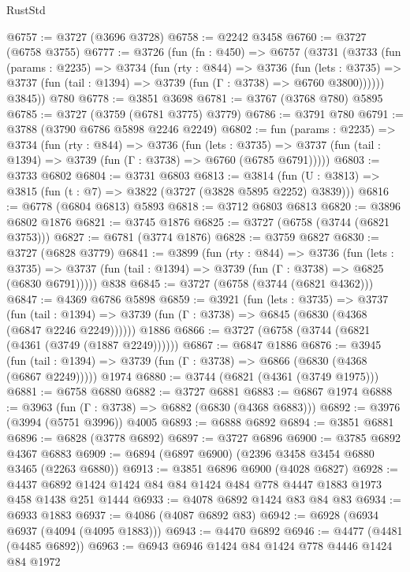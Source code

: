 \begin{lexlean}{RustStd}
\begin{coremodule}
@6757 := @3727 (@3696 @3728)
@6758 := @2242 @3458
@6760 := @3727 (@6758 @3755)
@6777 := @3726
    (fun (fn : @450) =>
    @6757
      (@3731
        (@3733
          (fun (params : @2235) =>
          @3734
            (fun (rty : @844) =>
            @3736
              (fun (lets : @3735) =>
              @3737 (fun (tail : @1394) => @3739 (fun (Γ : @3738) => @6760 @3800))))))
        @3845))
    @780
@6778 := @3851 @3698
@6781 := @3767 (@3768 @780) @5895
@6785 := @3727 (@3759 (@6781 @3775) @3779)
@6786 := @3791 @780
@6791 := @3788 (@3790 @6786 @5898 @2246 @2249)
@6802 := fun (params : @2235) =>
  @3734
    (fun (rty : @844) =>
    @3736
      (fun (lets : @3735) =>
      @3737 (fun (tail : @1394) => @3739 (fun (Γ : @3738) => @6760 (@6785 @6791)))))
@6803 := @3733 @6802
@6804 := @3731 @6803
@6813 := @3814 (fun (U : @3813) => @3815 (fun (t : @7) => @3822 (@3727 (@3828 @5895 @2252) @3839)))
@6816 := @6778 (@6804 @6813) @5893
@6818 := @3712 @6803 @6813
@6820 := @3896 @6802 @1876
@6821 := @3745 @1876
@6825 := @3727 (@6758 (@3744 (@6821 @3753)))
@6827 := @6781 (@3774 @1876)
@6828 := @3759 @6827
@6830 := @3727 (@6828 @3779)
@6841 := @3899
    (fun (rty : @844) =>
    @3736
      (fun (lets : @3735) =>
      @3737 (fun (tail : @1394) => @3739 (fun (Γ : @3738) => @6825 (@6830 @6791)))))
    @838
@6845 := @3727 (@6758 (@3744 (@6821 @4362)))
@6847 := @4369 @6786 @5898
@6859 := @3921
    (fun (lets : @3735) =>
    @3737
      (fun (tail : @1394) => @3739 (fun (Γ : @3738) => @6845 (@6830 (@4368 (@6847 @2246 @2249))))))
    @1886
@6866 := @3727 (@6758 (@3744 (@6821 (@4361 (@3749 (@1887 @2249))))))
@6867 := @6847 @1886
@6876 := @3945
    (fun (tail : @1394) => @3739 (fun (Γ : @3738) => @6866 (@6830 (@4368 (@6867 @2249)))))
    @1974
@6880 := @3744 (@6821 (@4361 (@3749 @1975)))
@6881 := @6758 @6880
@6882 := @3727 @6881
@6883 := @6867 @1974
@6888 := @3963 (fun (Γ : @3738) => @6882 (@6830 (@4368 @6883)))
@6892 := @3976 (@3994 (@5751 @3996)) @4005
@6893 := @6888 @6892
@6894 := @3851 @6881
@6896 := @6828 (@3778 @6892)
@6897 := @3727 @6896
@6900 := @3785 @6892 @4367 @6883
@6909 := @6894 (@6897 @6900) (@2396 @3458 @3454 @6880 @3465 (@2263 @6880))
@6913 := @3851 @6896 @6900 (@4028 @6827)
@6928 := @4437 @6892 @1424 @1424 @84 @84 @1424 @484 @778 @4447 @1883 @1973 @458 @1438 @251 @1444
@6933 := @4078 @6892 @1424 @83 @84 @83
@6934 := @6933 @1883
@6937 := @4086 (@4087 @6892 @83)
@6942 := @6928 (@6934 @6937 (@4094 (@4095 @1883)))
@6943 := @4470 @6892
@6946 := @4477 (@4481 (@4485 @6892))
@6963 := @6943
    @6946
    @1424
    @84
    @1424
    @778
    @4446
    @1424
    @84
    @1972

\end{coremodule}
\end{lexlean}
